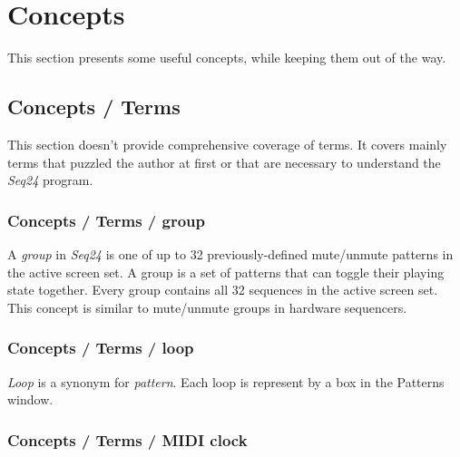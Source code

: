 %
%
%

\section{Concepts}
\label{sec:concepts}

   This section presents some useful concepts, while keeping them out of the
   way.

\subsection{Concepts / Terms}
\label{subsec:concepts_terms}

   This section doesn't provide comprehensive coverage of terms.  It
   covers mainly terms that puzzled the author at first or that are
   necessary to understand the \textsl{Seq24} program.

\subsubsection{Concepts / Terms / group}
\label{subsubsec:concepts_terms_group}

   A \textsl{group} in \textsl{Seq24} is one of up to 32 previously-defined
   mute/unmute patterns in the active screen set.
   A group is a set of patterns that can toggle their playing state
   together.  Every group contains all 32 sequences in the active screen
   set.  This concept is similar to mute/unmute groups in hardware
   sequencers.

\subsubsection{Concepts / Terms / loop}
\label{subsubsec:concepts_terms_loop}

   \textsl{Loop}
   is a synonym for \textsl{pattern}.
   Each loop is represent by a box in the Patterns window.

\subsubsection{Concepts / Terms / MIDI clock}
\label{subsubsec:concepts_terms_midi_clock}

